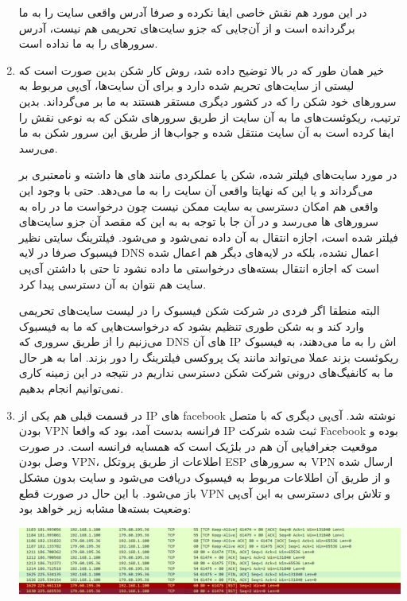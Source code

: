 \documentclass[12pt]{article}
\begin{document}
\begin{enumerate}
در این مورد  هم نقش خاصی ایفا نکرده و صرفا آدرس واقعی سایت  را به ما برگردانده است و از آن‌جایی که جزو سایت‌های تحریمی هم نیست، آدرس سرورهای  را به ما نداده است.


\item

خیر همان طور که در بالا توضیح داده شد، روش کار شکن بدین صورت است که لیستی از سایت‌های تحریم شده دارد و برای آن سایت‌ها، آی‌پی مربوط به سرورهای خود شکن را که در کشور دیگری مستقر هستند به ما بر می‌گرداند. بدین ترتیب، ریکوئست‌های ما به آن سایت از طریق سرورهای شکن که به نوعی نقش  را ایفا کرده است به آن سایت منتقل شده و جواب‌ها از طریق این سرور شکن به ما می‌رسد.

در مورد سایت‌های فیلتر شده، شکن یا عملکردی مانند  های  ها داشته و  نامعتبری بر می‌گرداند و یا این که نهایتا  واقعی آن سایت را به ما می‌دهد. حتی با وجود این  واقعی هم امکان دسترسی به سایت ممکن نیست چون درخواست ما در راه به سرورهای  ها می‌رسد و در آن جا با توجه به به این که مقصد آن جزو  سایت‌های فیلتر شده است، اجازه انتقال به آن داده نمی‌شود و  می‌شود. فیلترینگ سایتی نظیر فیسبوک صرفا در لایه DNS اعمال نشده، بلکه در لایه‌های دیگر هم اعمال شده است که اجازه انتقال بسته‌های درخواستی ما داده نشود تا حتی با داشتن آی‌پی سایت هم نتوان به آن دسترسی پیدا کرد.

البته منطقا اگر فردی در شرکت شکن فیسبوک را در لیست سایت‌های تحریمی وارد کند و به شکن طوری تنظیم بشود که درخواست‌هایی که ما به فیسبوک می‌زنیم را از طریق سروری که DNS های‌ آن IP اش را به ما می‌دهند، به فیسبوک ریکوئست بزند عملا می‌تواند مانند یک پروکسی فیلترینگ را دور بزند. اما به هر حال ما به کانفیگ‌های درونی شرکت شکن دسترسی نداریم در نتیجه در این زمینه کاری نمی‌توانیم انجام بدهیم.

\item

در قسمت قبلی هم یکی از IP های facebook نوشته شد. آی‌پی دیگری که با متصل بودن VPN فرانسه بدست آمد،  بود که واقعا IP ثبت شده شرکت Facebook بوده و موقعیت جغرافیایی آن هم در بلژیک است که همسایه فرانسه است.  در صورت وصل بودن VPN، اطلاعات از طریق پروتکل ESP به سرورهای VPN ارسال شده و از طریق آن اطلاعات مربوط به فیسبوک دریافت می‌شود و سایت بدون مشکل باز می‌شود. با این حال در صورت قطع VPN و تلاش برای دسترسی به این آی‌پی وضعیت بسته‌ها مشابه زیر خواهد بود:



	\begin{center}
	\includegraphics[width = 0.5 \textwidth]{images/8.png}
\end{center}


\end{enumerate}
\end{document}
